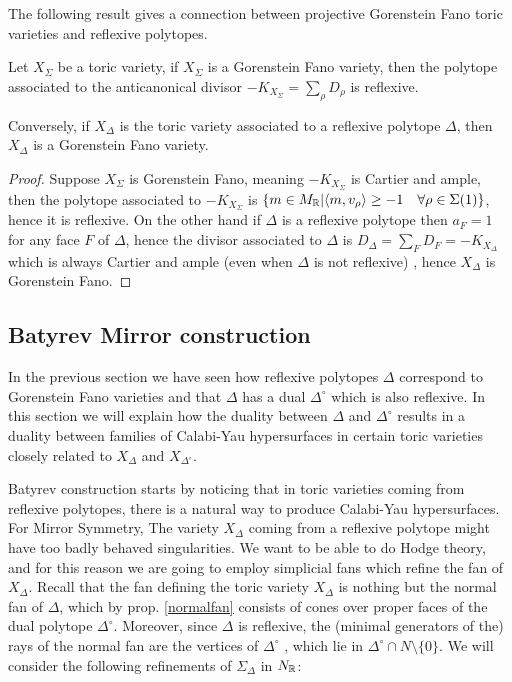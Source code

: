 \documentclass[../main.tex]{subfiles}
\begin{document}

The following result gives a connection between projective Gorenstein Fano toric varieties and reflexive polytopes.
\begin{theorem} \textup{\cite[Thm 8.3.4]{CLS11}}
    Let $X_\Sigma$  be a toric variety, if $X_\Sigma$ is a Gorenstein Fano variety, then the polytope associated to the anticanonical divisor $-K_{X_\Sigma} = \sum_\rho D_\rho$ is reflexive.
    
Conversely, if $X_\Delta$ is the toric variety associated to a reflexive polytope $\Delta$, then $X_\Delta$ is
a Gorenstein Fano variety.
\end{theorem}
\begin{proof}
     Suppose $X_\Sigma$ is Gorenstein Fano, meaning $-K_{X_\Sigma}$
is Cartier and ample, then the polytope associated
to $-K_{X_\Sigma}$ is $\{ m \in M_{\mathbb{R}} | \langle m, v_\rho \rangle \geq -1 \quad \forall \rho \in \Sigma(1) \}$, hence it is reflexive.
On the other hand if $\Delta$ is a reflexive polytope then $a_F = 1$ for any face $F$ of $\Delta$, hence the divisor associated to $\Delta$ is $D_\Delta = \sum_F D_F =-K_{X_\Delta}$ which is always Cartier and ample (even when $\Delta$ is not reflexive) , hence $X_\Delta$ is Gorenstein Fano. 
\end{proof}

\subsection{Batyrev Mirror construction}
In the previous section we have seen how reflexive polytopes $\Delta$ correspond to Gorenstein Fano varieties and that $\Delta$ has a dual  $\Delta^\circ$ which is also reflexive. In this section we will explain how the duality between $\Delta$ and $\Delta^\circ$ results in a duality between families of Calabi-Yau hypersurfaces in certain toric varieties closely related to  $X_\Delta$ and  $X_{\Delta^\circ}$.


Batyrev construction starts by noticing that in toric varieties coming from reflexive polytopes, there is a natural way to produce Calabi-Yau hypersurfaces.  For Mirror Symmetry, The variety $X_\Delta$ coming from a reflexive polytope might have too badly behaved singularities. We want to be able to do Hodge theory, and for this reason we are going to employ simplicial fans which refine the fan of $X_\Delta$. 
Recall that the fan defining the toric variety $X_\Delta$ is nothing but the normal fan of $\Delta$, which by prop. \ref{normalfan} consists of cones over proper faces of the dual polytope $\Delta^\circ$. Moreover, since $\Delta$ is reflexive, the (minimal generators of the) rays of the normal fan are the vertices of  $\Delta^\circ$ , which lie in $\Delta^\circ \cap N \setminus \{ 0 \}$. We will consider the following refinements of $\Sigma_\Delta$ in $N_{\mathbb{R}}$:
\end{document}
